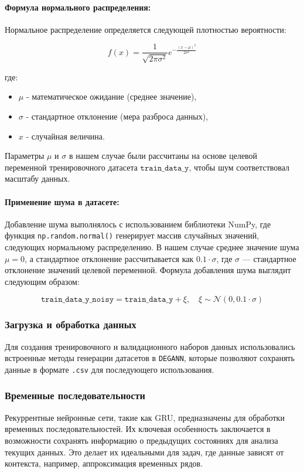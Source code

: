 \paragraph{Формула нормального распределения:}
Нормальное распределение определяется следующей плотностью вероятности:

\[
f(x) = \frac{1}{\sqrt{2 \pi \sigma^2}} e^{-\frac{(x - \mu)^2}{2 \sigma^2}}
\]

где:
\begin{itemize}
    \item $\mu$ - математическое ожидание (среднее значение),
    \item $\sigma$ - стандартное отклонение (мера разброса данных),
    \item $x$ - случайная величина.
\end{itemize}

Параметры $\mu$ и $\sigma$ в нашем случае были рассчитаны на основе целевой переменной тренировочного датасета $\texttt{train\_data\_y}$, чтобы шум соответствовал масштабу данных.

\paragraph{Применение шума в датасете:}
Добавление шума выполнялось с использованием библиотеки NumPy, где функция \texttt{np.random.normal()} генерирует массив случайных значений, следующих нормальному распределению. В нашем случае среднее значение шума $\mu = 0$, а стандартное отклонение рассчитывается как $0.1 \cdot \sigma$, где $\sigma$ --- стандартное отклонение значений целевой переменной. Формула добавления шума выглядит следующим образом:

\[
\texttt{train\_data\_y\_noisy} = \texttt{train\_data\_y} + \xi, \quad \xi \sim \mathcal{N}(0, 0.1 \cdot \sigma)
\]

\subsubsection{Загрузка и обработка данных}
Для создания тренировочного и валидационного наборов данных использовались встроенные методы генерации датасетов в \texttt{DEGANN}, которые позволяют сохранять данные в формате \texttt{.csv} для последующего использования.


\subsubsection{Временные последовательности}
Рекуррентные нейронные сети, такие как GRU, предназначены для обработки временных последовательностей. Их ключевая особенность заключается в возможности сохранять информацию о предыдущих состояниях для анализа текущих данных. Это делает их идеальными для задач, где данные зависят от контекста, например, аппроксимация временных рядов.

